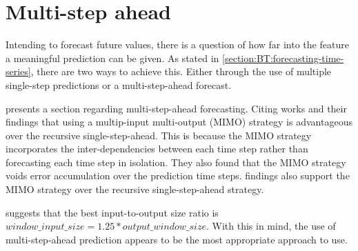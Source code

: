 \section{Multi-step ahead}
\label{section:RelatedWork:multi-step-ahead}
Intending to forecast future values, there is a question of how far into the feature a meaningful prediction can be given.
As stated in \autoref{section:BT:forecasting-time-series}, there are two ways to achieve this. 
Either through the use of multiple single-step predictions or a multi-step-ahead forecast.

\cite{Hewamalage2021} presents a section regarding multi-step-ahead forecasting.
Citing \cite{BenTaieb2011} works and their findings that using a multip-input multi-output (MIMO) strategy is
advantageous over the recursive single-step-ahead.
This is because the MIMO strategy incorporates the inter-dependencies between each time step rather than forecasting
each time step in isolation.
They also found that the MIMO strategy voids error
accumulation over the prediction time steps.
\cite{Ramos2015} findings also support the MIMO strategy over the recursive
single-step-ahead strategy.

\cite{Hewamalage2021} suggests that the best input-to-output size ratio
is $window\_input\_size = 1.25 * output\_window\_size$.
With this in mind, the use of multi-step-ahead prediction appears to be the most appropriate approach to use.